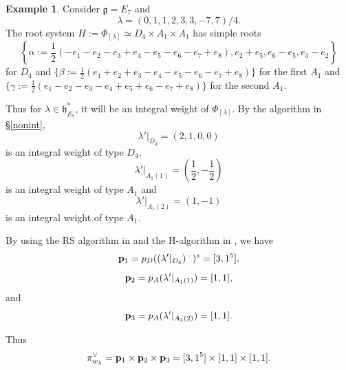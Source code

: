 \documentclass[reqno,12pt]{amsart}
\numberwithin{equation}{section}
\theoremstyle{plain}
\theoremstyle{definition}
\newtheorem{ex}[Thm]{Example}
\newcommand{\lam}{\lambda}
\newcommand{\ep}{\varepsilon}
\newcommand{\aff}{ \mathbf{a} }
\begin{document}
\begin{ex}\label{e7-ex}
Consider $\mathfrak{g}=E_7$ and $$\lambda=(0,1,1,2,3,3,-7,7)/4.$$
The root system $H:=\Phi_{[\lambda]} \simeq D_4 \times A_1 \times A_1$ has simple roots
$$ \left\{\alpha:=\frac{1}{2}(-e_1-e_2-e_3+e_4-e_5-e_6-e_7+e_8), e_2 + e_5, e_6 - e_5, e_3- e_2 \right\}$$
for $D_4$ and $\{\beta:=\frac{1}{2}(e_1+e_2+e_3-e_4-e_5-e_6-e_7+e_8)\}$ for the first $A_1$ and $\{\gamma:=\frac{1}{2}(e_1-e_2-e_3-e_4+e_5+e_6-e_7+e_8)\}$  for the second $A_1$. 

   Thus for $\lam\in \mathfrak{h}_{E_7}^* $, it will be an integral weight  of ${\Phi_{[\lambda]}}$. By the algorithm in \S \ref{nonint}, $$\lam'|_{{D_4}}
    =(2,1,0,0)$$ is an integral weight of type $D_4$,         $$\lam'|_{{A_1(1)}}=\left(\frac{1}{2},-\frac{1}{2}\right)$$ is an integral weight of type $A_1$ and $$\lam'|_{{A_1(2)}}=(1,-1)$$ is an integral weight of type $A_1$. 
   
  




By using the RS algorithm in \cite{BXX} and the H-algorithm in \cite{BMW},  we have 
$${\bf p}_{1}=p_{D}((\lam'|_{D_4})^-)^s=[3,1^5],$$
$${\bf p}_{2}= p_{A}(\lam'|_{A_1(1)})=[1,1],$$
 and $${\bf p}_{3}= p_{A}(\lam'|_{A_1(2)})=[1,1].$$
 
Thus
$$\pi^{\vee}_{w_{\lam}}={\bf p}_{1}\times {\bf p}_{2}\times {\bf p}_{3}=[3,1^5]\times [1,1]\times [1,1].$$ 


\end{ex}
\end{document}
